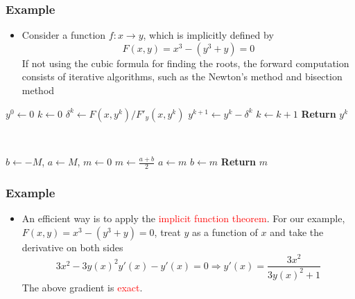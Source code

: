 \documentclass{beamer}
\begin{document}
\begin{frame}
	\frametitle{Example}

	\begin{itemize}
		\item Consider a function $f:x\rightarrow y$, which is implicitly defined by
		      $$F(x,y) = x^3 - (y^3+y) = 0$$
		      If not using the cubic formula for finding the roots, the forward computation consists of iterative algorithms, such as the Newton's method and bisection method
	\end{itemize}



	\begin{minipage}[t]{0.48\textwidth}
		\centering
		\begin{algorithmic}
			\State $y^0 \gets 0$
			\State $k \gets 0$
			\State $\delta^k \gets F(x, y^k)/F'_y(x,y^k)$
			\State $y^{k+1}\gets y^k - \delta^k$
			\State $k \gets k+1$
			\EndWhile
			\State \textbf{Return} $y^k$
		\end{algorithmic}
	\end{minipage}~
	\begin{minipage}[t]{0.48\textwidth}
		\centering
		\begin{algorithmic}
			\State $b \gets -M$, $a\gets M$, $m\gets 0$
			\While {$|F(x, m)|>\epsilon$}
			\State $m \gets \frac{a+b}{2}$
			\If{$F(x, m)>0$}
			\State $a\gets m$
			\Else
			\State $b\gets m$
			\EndIf
			\EndWhile
			\State \textbf{Return} $m$
		\end{algorithmic}

	\end{minipage}

\end{frame}

\begin{frame}
	\frametitle{Example}

	\begin{itemize}
		\item An efficient way is to apply the \textcolor{red}{implicit function theorem}. For our example, $F(x,y)=x^3-(y^3+y)=0$, treat $y$ as a function of $x$ and take the derivative on both sides
		      $$3x^2 - 3y(x)^2y'(x)-y'(x)=0\Rightarrow y'(x) = \frac{3x^2}{3y(x)^2+1}$$
		      The above gradient is \textcolor{red}{exact}.
	\end{itemize}

\end{frame}
\end{document}
